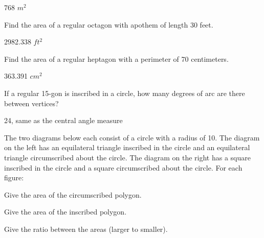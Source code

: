 \begin{exercises}
\begin{ex}
\begin{flushright}
\begin{tikzpicture}
\end{tikzpicture}	
\end{flushright}
	
	\begin{sol}
	768 $m^2$
	\end{sol}
	\end{ex}
	
	\smallskip
	
	\begin{ex}
	\e Find the area of a regular octagon with apothem of length 30 feet.
	\begin{sol}
	2982.338 $ft^2$
	\end{sol}
	\end{ex}
	
	\bigskip

	\begin{ex}
	\e Find the area of a regular heptagon with a perimeter of 70 centimeters.
	\begin{sol}
	363.391 $cm^2$
	\end{sol}
	\end{ex}

	\bigskip
	
	\begin{ex} If a regular 15-gon is inscribed in a circle, how many degrees of arc are there between vertices?
	 
	\begin{sol}
	24\degree, same as the central angle measure
	\end{sol}
	\end{ex}
	
	\medskip
	
	\begin{ex} \e The two diagrams below each consist of a circle  with a radius of 10.  The diagram on the left has an equilateral triangle inscribed in the circle and an equilateral triangle circumscribed about the circle.  The diagram on the right has a square inscribed in the circle and a square circumscribed about the circle.  For each figure:
	\begin{exparts}
	\item Give the area of the circumscribed polygon.
	\item Give the area of the inscribed polygon.
	\item Give the ratio between the areas (larger to smaller).
	\end{exparts}
	
	\begin{center}
	\begin{tikzpicture}


\end{tikzpicture}
\end{center}
\end{ex}
\end{exercises}
